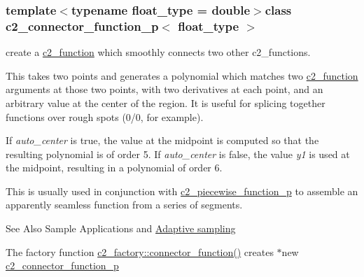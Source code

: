 \subsubsection*{template$<$typename float\-\_\-type = double$>$class c2\-\_\-connector\-\_\-function\-\_\-p$<$ float\-\_\-type $>$}

create a \hyperlink{classc2__function}{c2\-\_\-function} which smoothly connects two other c2\-\_\-functions.

This takes two points and generates a polynomial which matches two \hyperlink{classc2__function}{c2\-\_\-function} arguments at those two points, with two derivatives at each point, and an arbitrary value at the center of the region. It is useful for splicing together functions over rough spots (0/0, for example). 

If {\itshape auto\-\_\-center} is true, the value at the midpoint is computed so that the resulting polynomial is of order 5. If {\itshape auto\-\_\-center} is false, the value {\itshape y1} is used at the midpoint, resulting in a polynomial of order 6.

This is usually used in conjunction with \hyperlink{classc2__piecewise__function__p}{c2\-\_\-piecewise\-\_\-function\-\_\-p} to assemble an apparently seamless function from a series of segments. \begin{DoxySeeAlso}{See Also}
Sample Applications and \hyperlink{classc2__function_aea75f73d6a97087571c163ae4e514652}{Adaptive sampling}
\end{DoxySeeAlso}
The factory function \hyperlink{classc2__factory_ac8c9d70e5c486a0025e288e5911f2a55}{c2\-\_\-factory\-::connector\-\_\-function()} creates $\ast$new \hyperlink{classc2__connector__function__p}{c2\-\_\-connector\-\_\-function\-\_\-p} 

